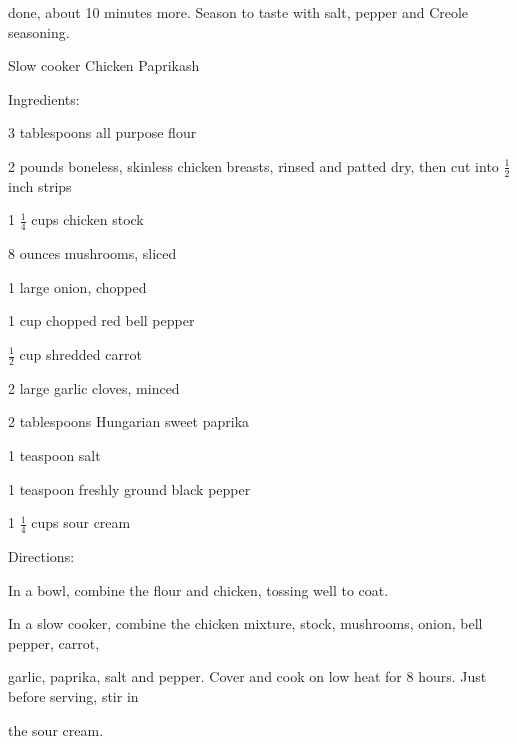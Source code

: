 \documentclass[a4paper,portrait,12pt]{book}
\begin{document}
done, about 10 minutes more. Season to taste with salt, pepper and Creole seasoning.







\newpage
Slow cooker Chicken Paprikash




Ingredients:




3 tablespoons all purpose flour




2 pounds boneless, skinless chicken breasts, rinsed and patted dry, then cut into $\frac{1}{2}$ inch strips




1 $\frac{1}{4}$ cups chicken stock




8 ounces mushrooms, sliced




1 large onion, chopped




1 cup chopped red bell pepper




$\frac{1}{2}$ cup shredded carrot




2 large garlic cloves, minced




2 tablespoons Hungarian sweet paprika




1 teaspoon salt




1 teaspoon freshly ground black pepper




1 $\frac{1}{4}$ cups sour cream




Directions:




In a bowl, combine the flour and chicken, tossing well to coat.




In a slow cooker, combine the chicken mixture, stock, mushrooms, onion, bell pepper, carrot,




garlic, paprika, salt and pepper. Cover and cook on low heat for 8 hours. Just before serving, stir in




the sour cream.
\end{document}
